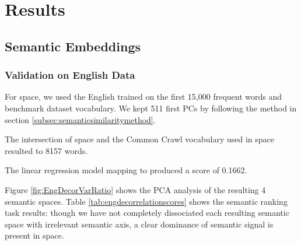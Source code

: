 \chapter{Results} %

\label{chap:results} %

\section{Semantic Embeddings}
\subsection{Validation on English Data}
For  space, we used the English  trained on the first 15,000 frequent words and benchmark dataset vocabulary. We kept 511 first PCs by following the method in section \ref{subsec:semanticsimilaritymethod}.

The intersection of  space and the Common Crawl vocabulary used in  space resulted to 8157 words. 

The linear regression model mapping  to  produced a  score of 0.1662.

Figure \ref{fig:EngDecorVarRatio} shows the PCA analysis of the resulting 4 semantic spaces. Table \ref{tab:engdecorrelationscores} shows the semantic ranking task results: though we have not completely dissociated each resulting semantic space with irrelevant semantic axis, a clear dominance of \association semantic signal is present in  space. 

